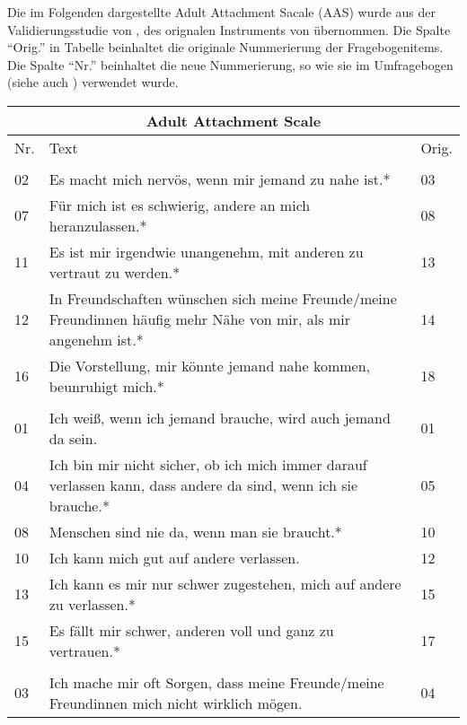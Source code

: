 
Die im Folgenden dargestellte Adult Attachment Sacale (AAS) wurde aus der Validierungsstudie von , des orignalen Instruments von  übernommen. Die Spalte \enquote{Orig.} in Tabelle  beinhaltet die originale Nummerierung der Fragebogenitems. Die Spalte \enquote{Nr.} beinhaltet die neue Nummerierung, so wie sie im Umfragebogen (siehe auch ) verwendet wurde.


\begin{table}[htbp]
\begin{tabular}{|l | m{30em} | p{2em}|} 
  \hline
  \multicolumn{3}{|c|}{\textbf{Adult Attachment Scale}}\\
  \hline
  Nr. & Text & Orig. \\ 
  \hline\hline
  \rowcolor{lightgray}
  \multicolumn{3}{|l|}{Nähe}\\
  \hline
  02 & Es macht mich nervös, wenn mir jemand zu nahe ist.* & 03 \\
  07 & Für mich ist es schwierig, andere an mich heranzulassen.* & 08 \\
  11 & Es ist mir irgendwie unangenehm, mit anderen zu vertraut zu werden.* & 13 \\
  12 & In Freundschaften wünschen sich meine Freunde/meine Freundinnen häufig mehr Nähe von mir, als mir angenehm ist.* & 14 \\
  16 & Die Vorstellung, mir könnte jemand nahe kommen, beunruhigt mich.* & 18 \\
  \hline
  \rowcolor{lightgray} \multicolumn{3}{|l|}{Vertrauen}\\
  \hline
  01 & Ich weiß, wenn ich jemand brauche, wird auch jemand da sein. & 01 \\
  04 & Ich bin mir nicht sicher, ob ich mich immer darauf verlassen kann, dass andere da sind, wenn ich sie brauche.* & 05\\
  08 & Menschen sind nie da, wenn man sie braucht.* & 10 \\
  10 & Ich kann mich gut auf andere verlassen. & 12\\
  13 & Ich kann es mir nur schwer zugestehen, mich auf andere zu verlassen.* & 15\\
  15 & Es fällt mir schwer, anderen voll und ganz zu vertrauen.* & 17\\
  \hline
  \rowcolor{lightgray} \multicolumn{3}{|l|}{Angst}\\
  \hline
  03 & Ich mache mir oft Sorgen, dass meine Freunde/meine Freundinnen mich nicht wirklich mögen. & 04\\

\end{tabular}
\end{table}
